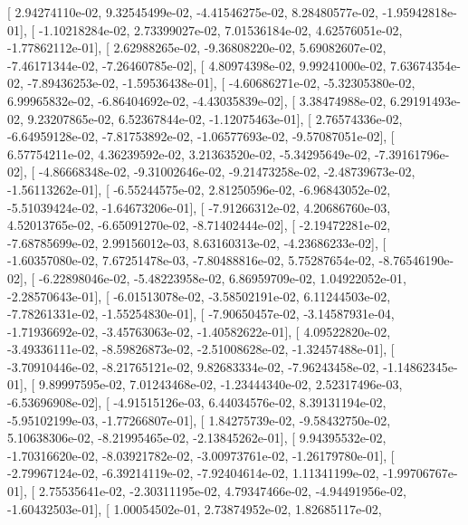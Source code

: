 \documentclass{article}
\begin{document}
       [  2.94274110e-02,   9.32545499e-02,  -4.41546275e-02,
          8.28480577e-02,  -1.95942818e-01],
       [ -1.10218284e-02,   2.73399027e-02,   7.01536184e-02,
          4.62576051e-02,  -1.77862112e-01],
       [  2.62988265e-02,  -9.36808220e-02,   5.69082607e-02,
         -7.46171344e-02,  -7.26460785e-02],
       [  4.80974398e-02,   9.99241000e-02,   7.63674354e-02,
         -7.89436253e-02,  -1.59536438e-01],
       [ -4.60686271e-02,  -5.32305380e-02,   6.99965832e-02,
         -6.86404692e-02,  -4.43035839e-02],
       [  3.38474988e-02,   6.29191493e-02,   9.23207865e-02,
          6.52367844e-02,  -1.12075463e-01],
       [  2.76574336e-02,  -6.64959128e-02,  -7.81753892e-02,
         -1.06577693e-02,  -9.57087051e-02],
       [  6.57754211e-02,   4.36239592e-02,   3.21363520e-02,
         -5.34295649e-02,  -7.39161796e-02],
       [ -4.86668348e-02,  -9.31002646e-02,  -9.21473258e-02,
         -2.48739673e-02,  -1.56113262e-01],
       [ -6.55244575e-02,   2.81250596e-02,  -6.96843052e-02,
         -5.51039424e-02,  -1.64673206e-01],
       [ -7.91266312e-02,   4.20686760e-03,   4.52013765e-02,
         -6.65091270e-02,  -8.71402444e-02],
       [ -2.19472281e-02,  -7.68785699e-02,   2.99156012e-03,
          8.63160313e-02,  -4.23686233e-02],
       [ -1.60357080e-02,   7.67251478e-03,  -7.80488816e-02,
          5.75287654e-02,  -8.76546190e-02],
       [ -6.22898046e-02,  -5.48223958e-02,   6.86959709e-02,
          1.04922052e-01,  -2.28570643e-01],
       [ -6.01513078e-02,  -3.58502191e-02,   6.11244503e-02,
         -7.78261331e-02,  -1.55254830e-01],
       [ -7.90650457e-02,  -3.14587931e-04,  -1.71936692e-02,
         -3.45763063e-02,  -1.40582622e-01],
       [  4.09522820e-02,  -3.49336111e-02,  -8.59826873e-02,
         -2.51008628e-02,  -1.32457488e-01],
       [ -3.70910446e-02,  -8.21765121e-02,   9.82683334e-02,
         -7.96243458e-02,  -1.14862345e-01],
       [  9.89997595e-02,   7.01243468e-02,  -1.23444340e-02,
          2.52317496e-03,  -6.53696908e-02],
       [ -4.91515126e-03,   6.44034576e-02,   8.39131194e-02,
         -5.95102199e-03,  -1.77266807e-01],
       [  1.84275739e-02,  -9.58432750e-02,   5.10638306e-02,
         -8.21995465e-02,  -2.13845262e-01],
       [  9.94395532e-02,  -1.70316620e-02,  -8.03921782e-02,
         -3.00973761e-02,  -1.26179780e-01],
       [ -2.79967124e-02,  -6.39214119e-02,  -7.92404614e-02,
          1.11341199e-02,  -1.99706767e-01],
       [  2.75535641e-02,  -2.30311195e-02,   4.79347466e-02,
         -4.94491956e-02,  -1.60432503e-01],
       [  1.00054502e-01,   2.73874952e-02,   1.82685117e-02,
\end{document}
